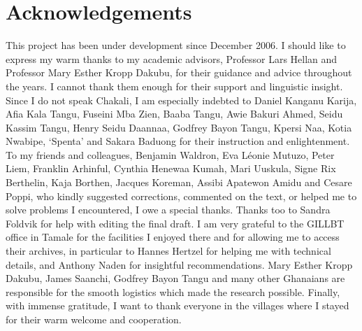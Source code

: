 \chapter*{Acknowledgements} 
\thispagestyle{plain}
This project has been under development since December 2006.  I should like to
express my warm thanks to my academic advisors, Professor Lars Hellan and
Professor Mary Esther Kropp Dakubu,  for their guidance and advice throughout
the years. I cannot thank them enough for their support and  linguistic insight.
Since I do not speak Chakali, I am especially indebted to  Daniel Kanganu
Karija,  Afia Kala Tangu, Fuseini Mba Zien,  Baaba Tangu, Awie Bakuri Ahmed, 
Seidu Kassim Tangu, Henry Seidu Daannaa, Godfrey Bayon Tangu,  Kpersi Naa, 
Kotia Nwabipe, `Spenta' and Sakara Baduong for their instruction and
enlightenment. To my
friends and colleagues, Benjamin Waldron, Eva Léonie Mutuzo, Peter Liem,
Franklin Arhinful, Cynthia Henewaa Kumah,  Mari Uuskula, Signe Rix Berthelin,
Kaja Borthen,
Jacques Koreman, Assibi Apatewon Amidu and Cesare Poppi, who kindly suggested
corrections, commented on the text, or helped me to solve problems I
encountered,  I owe a special thanks. Thanks too to  Sandra Foldvik for help
with editing the final draft. I am very grateful to the GILLBT office in Tamale
for the facilities I enjoyed there and for  allowing me to access their
archives, in particular to Hannes Hertzel for helping me with technical details,
and Anthony Naden for insightful recommendations. Mary Esther Kropp Dakubu,
James Saanchi, Godfrey Bayon Tangu and many other Ghanaians are responsible for
the smooth logistics  which made the research possible. Finally, with immense
gratitude, I want to thank everyone in the villages where I stayed for their
warm welcome and cooperation. 
\thispagestyle{plain}

